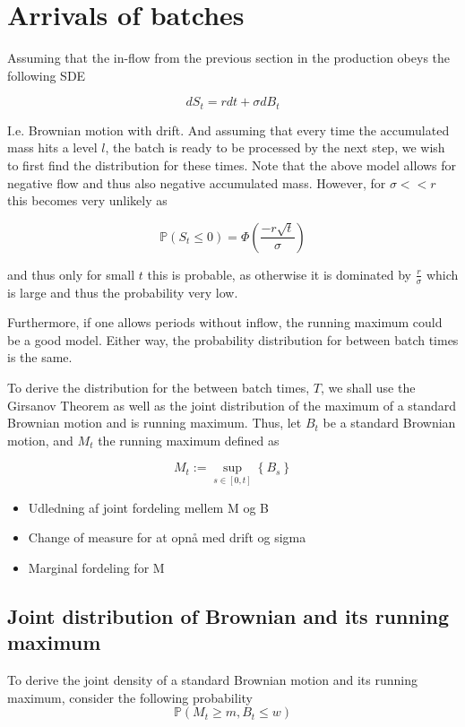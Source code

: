 \documentclass[../Thesis.tex]{subfiles}
\begin{document}
\cite{Hoare78}

\cite{CK01}



\newpage
\section{Arrivals of batches}
Assuming that the in-flow from the previous section in the production obeys the following SDE

$$dS_t = r dt + \sigma dB_t$$

I.e. Brownian motion with drift. And assuming that every time the accumulated mass hits a level $l$, the batch is ready to be processed by the next step, we wish to first find the distribution for these times. Note that the above model allows for negative flow and thus also negative accumulated mass. However, for $\sigma << r$ this becomes very unlikely as

$$\mathbb{P} \left( S_t \leq 0\right) = \Phi \left( \frac{-r \sqrt{t}}{\sigma } \right)$$

and thus only for small $t$ this is probable, as otherwise it is dominated by $\frac{r}{\sigma}$ which is large and thus the probability very low.

Furthermore, if one allows periods without inflow, the running maximum could be a good model. Either way, the probability distribution for between batch times is the same.


To derive the distribution for the between batch times, $T$, we shall use the Girsanov Theorem as well as the joint distribution of the maximum of a standard Brownian motion and is running maximum. Thus, let $B_t$ be a standard Brownian motion, and $M_t$ the running maximum defined as

$$M_t := \sup_{s\in [0,t]} \left\{ B_s \right\}$$


\begin{itemize}
    \item Udledning af joint fordeling mellem M og B
    \item Change of measure for at opnå med drift og sigma
    \item Marginal fordeling for M
\end{itemize}





\subsection{Joint distribution of Brownian and its running maximum}
To derive the joint density of a standard Brownian motion and its running maximum, consider the following probability
$$\mathbb{P}\left(M_t \geq m, B_t \leq w\right)$$
\end{document}
